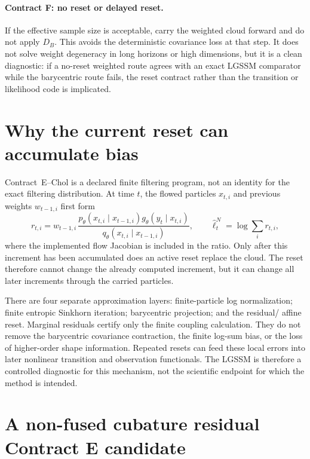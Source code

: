 \paragraph{Contract F: no reset or delayed reset.}
If the effective sample size is acceptable, carry the weighted cloud forward and
do not apply \(D_B\).  This avoids the deterministic covariance loss at that step.
It does not solve weight degeneracy in long horizons or high dimensions, but it is
a clean diagnostic: if a no-reset weighted route agrees with an exact LGSSM
comparator while the barycentric route fails, the reset contract rather than the
transition or likelihood code is implicated.

\section{Why the current reset can accumulate bias}
\label{sec:bf-eot-contract-e-bias}

Contract~E--Chol is a declared finite filtering program, not an identity for the
exact filtering distribution.  At time \(t\), the flowed particles \(x_{t,i}\)
and previous weights \(w_{t-1,i}\) first form
\begin{equation}
\label{eq:bf-eot-finite-increment}
 r_{t,i}=w_{t-1,i}\,
 \frac{p_\theta(x_{t,i}\mid x_{t-1,i})
       g_\theta(y_t\mid x_{t,i})}
      {q_\theta(x_{t,i}\mid x_{t-1,i})},
 \qquad
 \widehat\ell_t^N=\log\sum_i r_{t,i},
\end{equation}
where the implemented flow Jacobian is included in the ratio.  Only after this
increment has been accumulated does an active reset replace the cloud.  The
reset therefore cannot change the already computed increment, but it can change
all later increments through the carried particles.

There are four separate approximation layers: finite-particle log normalization;
finite entropic Sinkhorn iteration; barycentric projection; and the residual/
affine reset.  Marginal residuals certify only the finite coupling calculation.
They do not remove the barycentric covariance contraction, the finite log-sum
bias, or the loss of higher-order shape information.  Repeated resets can feed
these local errors into later nonlinear transition and observation functionals.
The LGSSM is therefore a controlled diagnostic for this mechanism, not the
scientific endpoint for which the method is intended.

\section{A non-fused cubature residual Contract E candidate}
\label{sec:bf-eot-cubature-residual}

